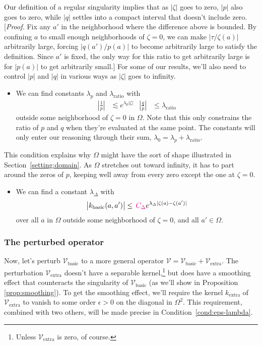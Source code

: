 \documentclass{article}
\makeatletter
\theoremstyle{plain}
\newcommand{\condconst}[2]{\item[($\text{\textsc{#1}} \mid #2$)]\protected@edef\@currentlabel{$\text{\textsc{#1}} \mid #2$}}
\newcommand{\volterra}{\mathcal{V}}
\newcommand{\hardpart}{\mathcal{V}_\text{basic}}
\newcommand{\softpart}{\mathcal{V}_\text{extra}}
\newcommand{\hardker}{k_\text{basic}}
\newcommand{\softker}{k_\text{extra}}
\newcommand{\domain}{\Omega}
\newenvironment{verify}{\color{ForestGreen}}{\color{black}}
\makeatother
\begin{document}
Our definition of a regular singularity implies that as $|\zeta|$ goes to zero, $|p|$ also goes to zero, while $|q|$ settles into a compact interval that doesn't include zero.
\begin{verify}
[\textit{Proof.} Fix any $a'$ in the neighborhood where the difference above is bounded. By confining $a$ to small enough neighborhoods of $\zeta = 0$, we can make $|\tau/\zeta(a)|$ arbitrarily large, forcing $|q(a')/p(a)|$ to become arbitrarily large to satisfy the definition. Since $a'$ is fixed, the only way for this ratio to get arbitrarily large is for $|p(a)|$ to get arbitrarily small.]
\end{verify}
For some of our results, we'll also need to control $|p|$ and $|q|$ in various ways as $|\zeta|$ goes to infinity.
\begin{itemize}
\condconst{slow}{\lambda_0}\label{cond:slow} We can find constants $\lambda_p$ and $\lambda_\text{ratio}$ with
\begin{align*}
\left|\frac{1}{p}\right| & \lesssim e^{\lambda_p |\zeta|} &
\left|\frac{q}{p}\right| & \le \lambda_\text{ratio}
\end{align*}
outside some neighborhood of $\zeta = 0$ in $\Omega$. Note that this only constrains the ratio of $p$ and $q$ when they're evaluated at the same point. The constants will only enter our reasoning through their sum, $\lambda_0 = \lambda_p + \lambda_\text{ratio}$.
\end{itemize}
This condition explains why $\domain$ might have the sort of shape illustrated in Section~\ref{setting:domain}. As $\domain$ stretches out toward infinity, it has to part around the zeros of $p$, keeping well away from every zero except the one at $\zeta = 0$.
\begin{itemize}
\condconst{diag$_0$}{\lambda_\Delta}\label{cond:diag-basic} We can find a constant $\lambda_\Delta$ with
\[ \big| \hardker(a, a') \big| \leq \,  \textcolor{magenta}{C_\Delta} e^{\lambda_\Delta|\zeta(a)-\zeta(a')|} \]
over all $a$ in $\domain$ outside some neighborhood of $\zeta = 0$, and all $a' \in \domain$.
\end{itemize}
\subsubsection{The perturbed operator}\label{setting:perturbed}

Now, let's perturb $\hardpart$ to a more general operator $\volterra=\hardpart +\softpart$. The perturbation $\softpart$ doesn't have a separable kernel,\footnote{Unless $\softpart$ is zero, of course.} but does have a smoothing effect that counteracts the singularity of $\hardpart$ (as we'll show in Proposition \ref{prop:smoothing}). To get the smoothing effect, we'll require the kernel $\softker$ of $\softpart$ to vanish to some order $\epsilon > 0$ on the diagonal in $\Omega^2$. This requirement, combined with two others, will be made precise in Condition~\eqref{cond:eps-lambda}.
\end{document}

